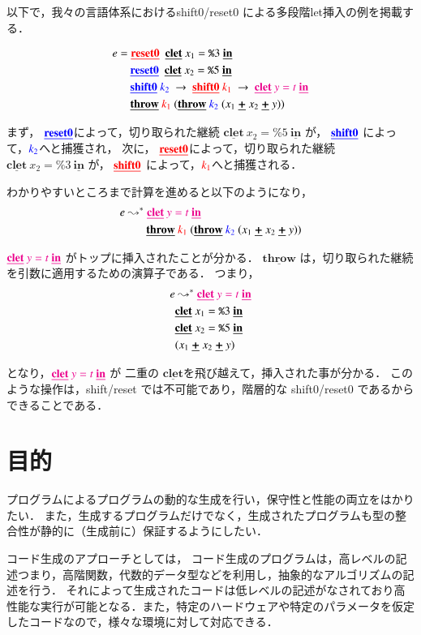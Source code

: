 \documentclass[10pt,a4j,twocolumn]{jarticle}
\newcommand\cResetz{\underline{\textbf{reset0}}}
\newcommand\cShiftz{\underline{\textbf{shift0}}}
\newcommand\cThrow{\underline{\textbf{throw}}}
\newcommand\cPlus{\underline{\textbf{+}}}
\newcommand\cLet{\underline{\textbf{clet}}}
\newcommand\cIn{\underline{\textbf{in}}}
\newcommand\csp[1]{\texttt{\%}{#1}}
\newcommand\too{\leadsto^*}
\newcommand\red[1]{\textcolor{red}{#1}}
\newcommand\magenta[1]{\textcolor{magenta}{#1}}
\newcommand\blue[1]{\textcolor{blue}{#1}}
\theoremstyle{definition}
\begin{document}
以下で，我々の言語体系におけるshift0/reset0 による多段階let挿入の例を掲載する．

\begin{align*}
    e &= \red{\cResetz} ~~\cLet~x_1=\csp{3}~\cIn \\
      &\phantom{=}~~ \blue{\cResetz} ~~\cLet~x_2=\csp{5}~\cIn \\
      &\phantom{=}~~ \blue{\cShiftz}~\blue{k_2}~\to~ \red{\cShiftz}~\red{k_1}~\to~ \magenta{\cLet~y=t~\cIn} \\
      &\phantom{=}~~ \cThrow~\red{k_1}~(\cThrow~\blue{k_2}~(x_1~\cPlus~x_2~\cPlus~y))
\end{align*}

まず，
$\blue{\cResetz}$によって，切り取られた継続 $\cLet~x_2=\csp{5}~\cIn$ が，
$\blue{\cShiftz}$ によって，$\blue{k_2}$へと捕獲され，
次に，
$\red{\cResetz}$によって，切り取られた継続 $\cLet~x_2=\csp{3}~\cIn$ が，
$\red{\cShiftz}$ によって，$\red{k_1}$へと捕獲される．

わかりやすいところまで計算を進めると以下のようになり，
\begin{align*}
  e & \too \magenta{\cLet~y=t~\cIn} \\
    & \phantom{\too}~~ \cThrow~\red{k_1}~(\cThrow~\blue{k_2}~(x_1~\cPlus~x_2~\cPlus~y))
\end{align*}

$\magenta{\cLet~y=t~\cIn}$ がトップに挿入されたことが分かる．
$\cThrow$ は，切り取られた継続を引数に適用するための演算子である．
つまり，
\begin{align*}
  e & \too \magenta{\cLet~y=t~\cIn} \\
    & \cLet~x_1=\csp{3}~\cIn \\
    & \cLet~x_2=\csp{5}~\cIn \\
    & (x_1~\cPlus~x_2~\cPlus~y)
\end{align*}

となり，$\magenta{\cLet~y=t~\cIn}$ が 二重の $\cLet$を飛び越えて，挿入された事が分かる．
このような操作は，shift/reset では不可能であり，階層的な shift0/reset0 であるからできることである．

\section{目的}
プログラムによるプログラムの動的な生成を行い，保守性と性能の両立をはかりたい．
また，生成するプログラムだけでなく，生成されたプログラムも型の整合性が静的に（生成前に）保証するようにしたい．

コード生成のアプローチとしては，
コード生成のプログラムは，高レベルの記述つまり，高階関数，代数的データ型などを利用し，抽象的なアルゴリズムの記述を行う．
それによって生成されたコードは低レベルの記述がなされており高性能な実行が可能となる．また，特定のハードウェアや特定のパラメータを仮定したコードなので，様々な環境に対して対応できる．
\end{document}
